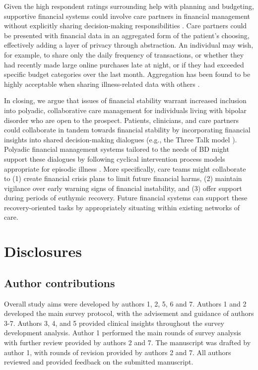 \documentclass[10pt]{article}
\begin{document}
Given the high respondent ratings surrounding help with planning and budgeting, supportive financial systems could involve care partners in financial management without explicitly sharing decision-making responsibilities \cite{blairknowing2023}. Care partners could be presented with financial data in an aggregated form of the patient's choosing, effectively adding a layer of privacy through abstraction. An individual may wish, for example, to share only the daily frequency of transactions, or whether they had recently made large online purchases late at night, or if they had exceeded specific budget categories over the last month. Aggregation has been found to be highly acceptable when sharing illness-related data with others \cite{hoefermultiplicative2021}.

In closing, we argue that issues of financial stability warrant increased inclusion into polyadic, collaborative care management for individuals living with bipolar disorder who are open to the prospect. Patients, clinicians, and care partners could collaborate in tandem towards financial stability by incorporating financial insights into shared decision-making dialogues (e.g., the Three Talk model \cite{elwynthreetalk2017}). Polyadic financial management systems tailored to the needs of BD might support these dialogues by following cyclical intervention process models appropriate for episodic illness \cite{vandeneijnde-damencollaborative2024}. More specifically, care teams might collaborate to (1) create financial crisis plans to limit future financial harms, (2) maintain vigilance over early warning signs of financial instability, and (3) offer support during periods of euthymic recovery. Future financial systems can support these recovery-oriented tasks by appropriately situating within existing networks of care.

\section{Disclosures}

\subsection{Author contributions}

Overall study aims were developed by authors 1, 2, 5, 6 and 7. Authors 1 and 2 developed the main survey protocol, with the advisement and guidance of authors 3-7. Authors 3, 4, and 5 provided clinical insights throughout the survey development analysis. Author 1 performed the main rounds of survey analysis with further review provided by authors 2 and 7. The manuscript was drafted by author 1, with rounds of revision provided by authors 2 and 7. All authors reviewed and provided feedback on the submitted manuscript.
\end{document}
